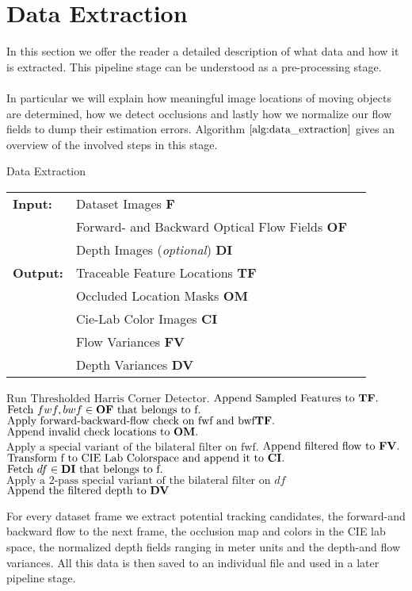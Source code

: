 \section{Data Extraction}
\label{sec:data_extraction}
In this section we offer the reader a detailed description of what data and how it is extracted. This pipeline stage can be understood as a pre-processing stage. \\ \\
In particular we will explain how meaningful image locations of moving objects are determined, how we detect occlusions and lastly how we normalize our flow fields to dump their estimation errors. Algorithm $\ref{alg:data_extraction}$ gives an overview of the involved steps in this stage.
\begin{algorithm}[H]
\caption{Data Extraction}
\begin{table}[H]
  \begin{tabular}{@{}lll@{}}
    \textbf{Input:} & Dataset Images \bf{F} \\
		& Forward- and Backward Optical Flow Fields \bf{OF} \\
 		& Depth Images (\emph{optional}) \bf{DI} \\
    \textbf{Output:} & Traceable Feature Locations \bf{TF} \\
    & Occluded Location Masks \bf{OM}\\
    & Cie-Lab Color Images \bf{CI} \\
    & Flow Variances \bf{FV} \\
    & Depth Variances \bf{DV} \\
    
  \end{tabular} 
\end{table}
\setlength{\fboxrule}{0pt} 
\begin{boxedminipage}{1.0\textwidth}
  \begin{algorithmic}[1]
        \State $\text{Run Thresholded Harris Corner Detector}.$
		\State $\text{Append Sampled Features to } \bf{TF}.$
		\State $\text{Fetch } fwf,bwf \in \bf{OF} \text{ that belongs to f}.$
		\State $\text{Apply forward-backward-flow check on fwf and bwf} \bf{TF}.$
		\State $\text{Append invalid check locations to } \bf{OM}.$
		\State $\text{Apply a special variant of the bilateral filter on fwf}.$
		\State $\text{Append filtered flow to } \bf{FV}.$
		\State $\text{Transform f to CIE Lab Colorspace and append it to } \bf{CI}.$
		\State $\text{Fetch } df \in \bf{DI} \text{ that belongs to f}.$
		\State $\text{Apply a 2-pass special variant of the bilateral filter on } df$
		\State $\text{Append the filtered depth to } \bf{DV}$
      \EndFor
  \end{algorithmic}
  \end{boxedminipage}
  \vskip1.5pt
\label{alg:data_extraction}
\end{algorithm}
For every dataset frame we extract potential tracking candidates, the forward-and backward flow to the next frame, the occlusion map and colors in the CIE lab space, the normalized depth fields ranging in meter units and the depth-and flow variances. All this data is then saved to an individual file and used in a later pipeline stage.
